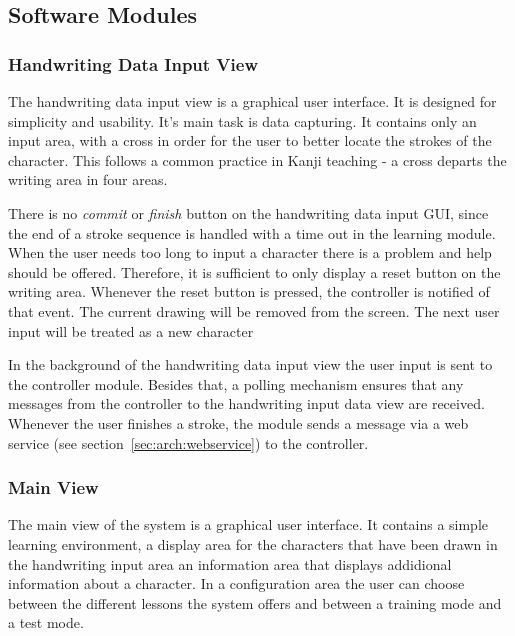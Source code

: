 \subsection{Software Modules}
\label{sec:arch:softwaremodules}

\subsubsection{Handwriting Data Input View}
\label{sec:arch:handwritingdatainputview}


The handwriting data input view is a graphical user interface. It is designed for
simplicity and usability. It's main task is data capturing.
It contains only an input area, with a cross in order for the user to better 
locate the strokes of the character. This follows a common practice in Kanji 
teaching - a cross departs the writing area in four areas.

There is no \emph{commit} or \emph{finish} button on the handwriting data 
input GUI, since the end of a stroke sequence is handled with a time out in 
the learning module. When the user needs too long to input a character there 
is a problem and help should be offered.
Therefore, it is sufficient to only display a reset button on the writing area.
Whenever the reset button is pressed, the controller is notified of that event.
The current drawing will be removed from the screen. The next user input will
be treated as a new character

In the background of the handwriting data input view the user input is sent to 
the controller module. Besides that, a polling mechanism ensures that any 
messages from the controller to the handwriting input data view are received.
Whenever the user finishes a stroke, the module sends a message via a web service
(see section~\ref{sec:arch:webservice}) to the controller.

\subsubsection{Main View}
\label{sec:arch:mainview}

The main view of the system is a graphical user interface. It contains a simple
learning environment, a display area for the characters that have been drawn
in the handwriting input area an information area that displays addidional 
information about a character. In a configuration area the user can choose 
between the different lessons the system offers and between a training mode
and a test mode.

